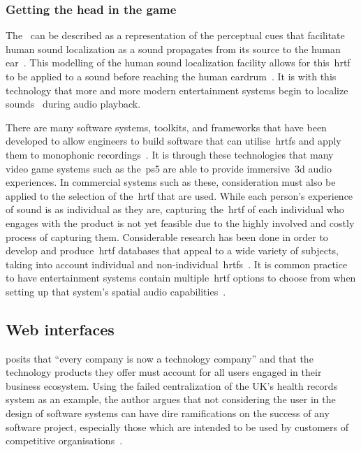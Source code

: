 \subsubsection{Getting the head in the game}

The~ can be described as a representation of the perceptual cues that facilitate human sound localization as a sound propagates from its source to the human ear~\citep{Suzuki2011}.
This modelling of the human sound localization facility allows for this~\gls{hrtf} to be applied to a sound before reaching the human eardrum~\citep{roginska2017immersive}.
It is with this technology that more and more modern entertainment systems begin to localize sounds~\citep{blauert_spatial, HONDA2007, roginska2017immersive, Suzuki2011, Xie2013, ps5_audio, soundscape_design} during audio playback.

There are many software systems, toolkits, and frameworks that have been developed to allow engineers to build software that can utilise~\glspl{hrtf} and apply them to monophonic recordings~\citep{3d_tune_in, resonance}.
It is through these technologies that many video game systems such as the~\gls{ps5} are able to provide immersive~\gls{3d} audio experiences.
In commercial systems such as these, consideration must also be applied to the selection of the~\gls{hrtf} that are used.
While each person's experience of sound is as individual as they are, capturing the~\gls{hrtf} of each individual who engages with the product is not yet feasible due to the highly involved and costly process of capturing them.
Considerable research has been done in order to develop and produce~\gls{hrtf} databases that appeal to a wide variety of subjects, taking into account individual and non-individual~\glspl{hrtf}~\citep{armstrong_}.
It is common practice to have entertainment systems contain multiple~\gls{hrtf} options to choose from when setting up that system's spatial audio capabilities~\citep{shukla2018user}.

\subsection{Web interfaces}\label{subsec:web-interfaces}
\citet{kantamneni2022user} posits
that ``every company is now a technology company''
and that the technology products they offer must account for all users engaged in their business ecosystem.
Using the failed centralization of the UK's health records system as an example, the author argues
that not considering the user in the design of software systems can have dire ramifications on the success of any software project,
especially those which are intended to be used by customers of competitive organisations~\citet{kantamneni2022user}.


